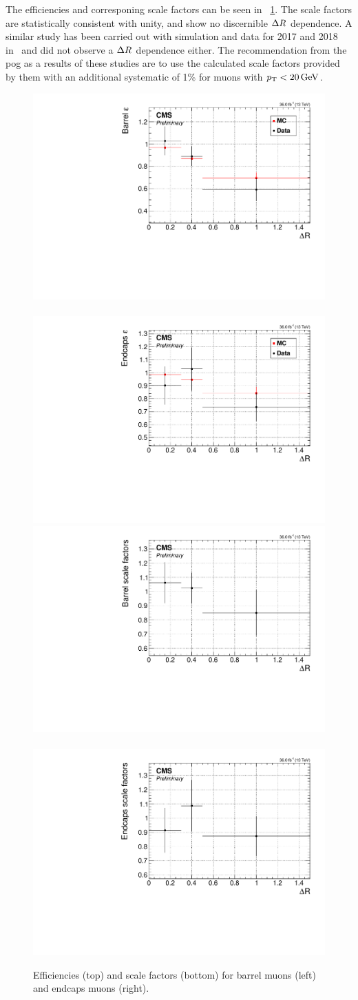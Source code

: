 The efficiencies and corresponing scale factors can be seen in ~\ref{fig:tb-eff-sf}. The scale factors are statistically consistent with unity, and show no discernible $\Delta R$ dependence. A similar study has been carried out with simulation and data for 2017 and 2018 in~\cite{muon-id-sf-2017-8} and did not observe a $\Delta R$ dependence either. The recommendation from the \gls{pog} as a results of these studies are to use the calculated scale factors provided by them with an additional systematic of 1\% for muons with $p_{\mathrm{T}}<20\,\text{Ge\hspace{-.08em}V}$.

\begin{figure}[!htbp]
\centering
\includegraphics[width=0.48\linewidth]{plots/scale_factors/barrelDeltaRSingleElectron.pdf} \,
\includegraphics[width=0.48\linewidth]{plots/scale_factors/endcapsDeltaRSingleElectron.pdf}  \\
\includegraphics[width=0.48\linewidth]{plots/scale_factors/barrelDeltaRisoScaleFactorsSingleElectron.pdf} \,
\includegraphics[width=0.48\linewidth]{plots/scale_factors/endcapsDeltaRisoScaleFactorsSingleElectron.pdf} \\
\caption[Efficiencies and scale factors]{Efficiencies (top) and scale factors (bottom) for barrel muons (left) and endcaps muons (right).}
\label{fig:tb-eff-sf}
\end{figure}